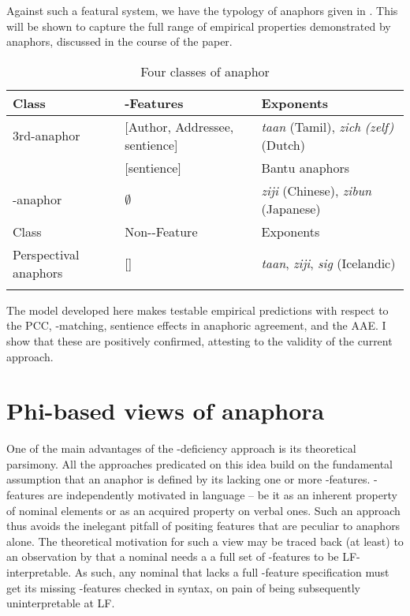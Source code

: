 \documentclass[output=paper, modfonts, nonflat]{langsci/langscibook}
\begin{document}
  Against such a featural system, we have the typology of anaphors
  given in . This will be shown to capture the full
  range of empirical properties demonstrated by anaphors, discussed in
  the course of the paper.
  
  \begin{table}
  	\caption{Four classes of anaphor\label{anaph3}}
  	\begin{tabularx}{\textwidth}{lQQ}  
  		\lsptoprule
  		Class &  \person-Features & Exponents\\  
  		\midrule
  		\textsc{3}rd-anaphor &  {[\textminus Author, \textminus Addressee, sentience]} & \textit{taan} (Tamil),
  		\textit{zich} \textit{(zelf)} (Dutch)\\\tablevspace
  		  & [sentience] & Bantu anaphors\\\tablevspace
  		\nul-anaphor &  $\emptyset$ & \textit{ziji} (Chinese),
  		\textit{zibun} (Japanese)\\
  		\midrule
  		Class & Non-\ph-Feature & Exponents\\
  		\midrule
  		Perspectival anaphors & [\dep] & \textit{taan},
  		\textit{ziji}, 
  		\textit{sig} (Icelandic)\\  		
  		\lspbottomrule
  	\end{tabularx}
  \end{table}
The model developed here makes testable empirical predictions with
  respect to the PCC, \ph-matching, sentience effects in anaphoric
  agreement, and the AAE. I show that these are positively confirmed,
  attesting to the validity of the current approach.

\newpage

\section{Phi-based views of anaphora}
\label{secphi}

One of the main advantages of the \ph-deficiency approach is its
  theoretical parsimony. All the approaches predicated on this idea
  build on the fundamental assumption that an anaphor is defined by
  its lacking one or more \ph-features. \ph-features are independently
  motivated in language -- be it as an inherent property of nominal
  elements or as an acquired property on verbal ones. Such an approach
  thus avoids the inelegant pitfall of positing features that are
  peculiar to anaphors alone. The theoretical motivation for such a
  view may be traced back (at least) to an observation by
  \citet{bouchard:1984} that a nominal needs a a full set of
  \ph-features to be LF-interpretable. As such, any nominal that lacks
  a full \ph-feature specification must get its missing \ph-features
  checked in syntax, on pain of being subsequently uninterpretable at
  LF.
\end{document}

